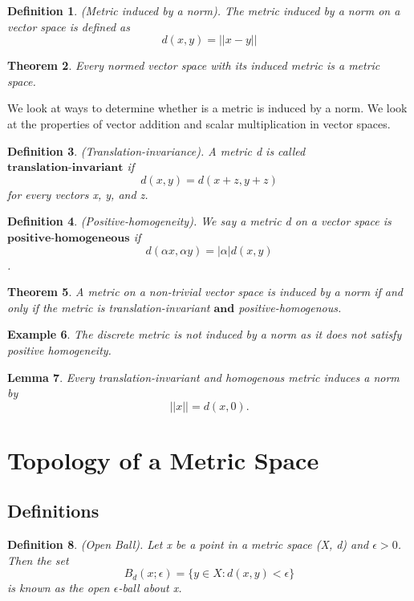 \documentclass[twoside]{article}
\newcounter{lecnum}
\newtheorem{theorem}{Theorem}[lecnum]
\newtheorem{lemma}[theorem]{Lemma}
\newtheorem{definition}[theorem]{Definition}
\newtheorem{example}[theorem]{Example}
\begin{document}
\begin{definition}(Metric induced by a norm). The metric induced by a norm on a vector space is defined as 
\[d(x,y) = ||x - y||\]
\end{definition}

\begin{theorem}Every normed vector space with its induced metric is a metric space.
\end{theorem}

We look at ways to determine whether is a metric is induced by a norm. We look at the properties of vector addition and scalar multiplication in vector spaces.
\begin{definition}(Translation-invariance). A metric d is called $\textbf{translation-invariant}$ if
\[d(x,y) = d(x+z, y+z)\] for every vectors x, y, and z.
\end{definition}
\begin{definition}(Positive-homogeneity). We say a metric d on a vector space is $\textbf{positive-homogeneous}$ if 
\[d(\alpha x, \alpha y) = |\alpha|d(x,y)\].
\end{definition}

\begin{theorem}A metric on a non-trivial vector space is induced by a norm if and only if the metric is translation-invariant $\textbf{and}$ positive-homogenous.
\end{theorem}

\begin{example}The discrete metric is not induced by a norm as it does not satisfy positive homogeneity.
\end{example}

\begin{lemma}Every translation-invariant and homogenous metric induces a norm by
$$
||x|| = d(x, 0).
$$
\end{lemma}

\section{Topology of a Metric Space}
\subsection{Definitions}
\begin{definition}(Open Ball). Let x be a point in a metric space (X, d) and $\epsilon > 0$. Then the set
$$
B_d(x;\epsilon) = \{y \in X: d(x, y) < \epsilon\}
$$
is known as the open $\epsilon$-ball about x.
\end{definition}
\end{document}
